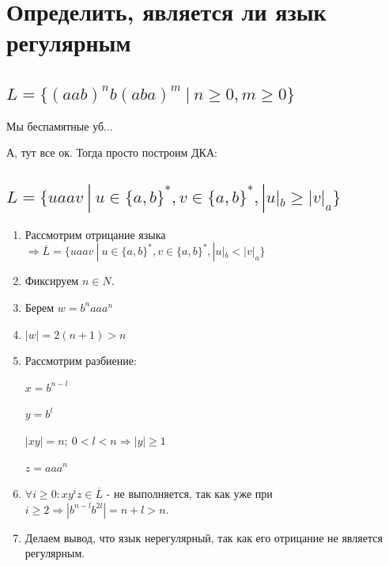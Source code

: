 \documentclass[a4paper,12pt]{article}
\begin{document}
\newpage

\section{Определить, является ли язык регулярным}

\subsection{$L = \{(aab)^nb(aba)^m \: | \: n \geq 0, m \geq 0\}$}

Мы беспамятные уб... 

А, тут все ок. Тогда просто построим ДКА:


\subsection{$L = \{uaav \: | \: u \in \{a, b\}^{*}, v \in \{a, b\}^*,  |u|_b \geq |v|_a\}$}

\begin{enumerate}
    \item Рассмотрим отрицание языка $\Rightarrow \overline{L} = \{uaav \: | \: u \in \{a, b\}^{*}, v \in \{a, b\}^*,  |u|_b < |v|_a\}$ 
    \item Фиксируем $n \in N$.
    \item Берем $w = b^naaa^n$
    \item $|w| = 2(n + 1) > n$
    \item Рассмотрим разбиение:
    
    $x = b^{n - l}$
    
    $y = b^l$
    
    $|xy| = n; \: 0 < l < n \Rightarrow |y| \geq 1$
    
    $z = aaa^n$
    
    \item $\forall i \geq 0: xy^iz \in \overline{L}$ - не выполняется, так как уже при $i \geq 2 \Rightarrow |b^{n - l}b^{2l}| = n + l > n$.
    \item Делаем вывод, что язык нерегулярный, так как его отрицание не является регулярным.
\end{enumerate}
\end{document}
